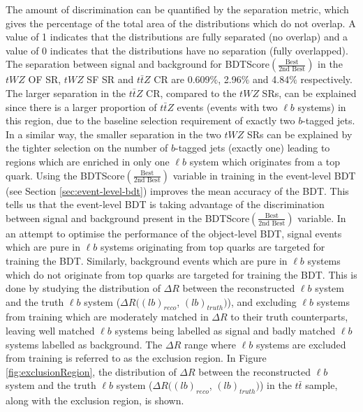 The amount of discrimination can be quantified by the separation metric, which gives the percentage of the total area of the distributions which do not overlap. A value of 1 indicates that the distributions are fully separated (no overlap) and a value of 0 indicates that the distributions have no separation (fully overlapped). The separation between signal and background for BDTScore$(\frac{\text{Best}}{\text{2nd Best}})$ in the $tWZ$ OF SR, $tWZ$ SF SR and $t\bar{t}Z$ CR are 0.609$\%$, 2.96$\%$ and 4.84$\%$ respectively. The larger separation in the $t\bar{t}Z$ CR, compared to the $tWZ$ SRs, can be explained since there is a larger proportion of $t\bar{t}Z$ events (events with two $\ell b$ systems) in this region, due to the baseline selection requirement of exactly two $b$-tagged jets. In a similar way, the smaller separation in the two $tWZ$ SRs can be explained by the tighter selection on the number of $b$-tagged jets (exactly one) leading to regions which are enriched in only one $\ell b$ system which originates from a top quark. Using the BDTScore$(\frac{\text{Best}}{\text{2nd Best}})$ variable in training in the event-level BDT (see Section \ref{sec:event-level-bdt}) improves the mean accuracy of the BDT. This tells us that the event-level BDT is taking advantage of the discrimination between signal and background present in the BDTScore$(\frac{\text{Best}}{\text{2nd Best}})$ variable. In an attempt to optimise the performance of the object-level BDT, signal events which are pure in $\ell b$ systems originating from top quarks are targeted for training the BDT. Similarly, background events which are pure in $\ell b$ systems which do not originate from top quarks are targeted for training the BDT. This is done by studying the distribution of $\Delta R$ between the reconstructed $\ell b$ system and the truth $\ell b$ system ($\Delta R((lb)_{reco}$, $(lb)_{truth})$), and excluding $\ell b$ systems from training which are moderately matched in $\Delta R$ to their truth counterparts, leaving well matched $\ell b$ systems being labelled as signal and badly matched $\ell b$ systems labelled as background. The $\Delta R$ range where $\ell b$ systems are excluded from training is referred to as the exclusion region. In Figure \ref{fig:exclusionRegion}, the distribution of $\Delta R$ between the reconstructed $\ell b$ system and the truth $\ell b$ system ($\Delta R((lb)_{reco}$, $(lb)_{truth})$) in the $t\bar{t}$ sample, along with the exclusion region, is shown.


